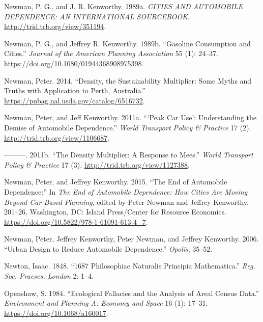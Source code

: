 \documentclass[
  11pt,
  openany]{memoir}
\newlength{\cslhangindent}
\newlength{\cslentryspacingunit} %
\newenvironment{CSLReferences}[2] %
 {%
  \setlength{\parindent}{0pt}
  \ifodd #1
  \let\oldpar\par
  \def\par{\hangindent=\cslhangindent\oldpar}
  \fi
  \setlength{\parskip}{#2\cslentryspacingunit}
 }%
 {}
\begin{document}
\begin{CSLReferences}{1}{0}
\leavevmode{}%
Newman, P. G., and J. R. Kenworthy. 1989a. \emph{{CITIES AND AUTOMOBILE DEPENDENCE}: {AN INTERNATIONAL SOURCEBOOK}}. \url{http://trid.trb.org/view/351194}.

\leavevmode{}%
Newman, P. G., and Jeffrey R. Kenworthy. 1989b. {``Gasoline {Consumption} and {Cities}.''} \emph{Journal of the American Planning Association} 55 (1): 24--37. \url{https://doi.org/10.1080/01944368908975398}.

\leavevmode{}%
Newman, Peter. 2014. {``Density, the {Sustainability Multiplier}: Some {Myths} and {Truths} with {Application} to {Perth}, {Australia}.''} \url{https://pubag.nal.usda.gov/catalog/6516732}.

\leavevmode{}%
Newman, Peter, and Jeff Kenworthy. 2011a. {``{`{Peak Car Use}'}: Understanding the {Demise} of {Automobile Dependence}.''} \emph{World Transport Policy \& Practice} 17 (2). \url{http://trid.trb.org/view/1106687}.

\leavevmode{}%
---------. 2011b. {``The {Density Multiplier}: A {Response} to {Mees}.''} \emph{World Transport Policy \& Practice} 17 (3). \url{http://trid.trb.org/view/1127388}.

\leavevmode{}%
Newman, Peter, and Jeffrey Kenworthy. 2015. {``The {End} of {Automobile Dependence}:''} In \emph{The {End} of {Automobile Dependence}: How {Cities Are Moving Beyond Car}-{Based Planning}}, edited by Peter Newman and Jeffrey Kenworthy, 201--26. {Washington, DC}: {Island Press/Center for Resource Economics}. \url{https://doi.org/10.5822/978-1-61091-613-4_7}.

\leavevmode{}%
Newman, Peter, Jeffrey Kenworthy, Peter Newman, and Jeffrey Kenworthy. 2006. {``Urban Design to Reduce Automobile Dependence.''} \emph{Opolis}, 35--52.

\leavevmode{}%
Newton, Isaac. 1848. {``1687 Philosophiae Naturalis Principia Mathematica.''} \emph{Reg. Soc. Praeses, London} 2: 1--4.

\leavevmode{}%
Openshaw, S. 1984. {``Ecological {Fallacies} and the {Analysis} of {Areal Census Data}.''} \emph{Environment and Planning A: Economy and Space} 16 (1): 17--31. \url{https://doi.org/10.1068/a160017}.


\end{CSLReferences}
\end{document}

